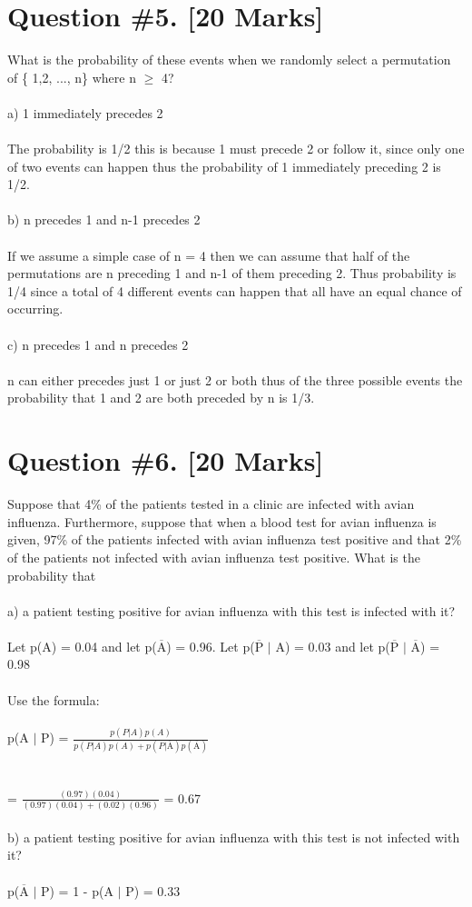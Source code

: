 \documentclass{article}
\begin{document}
\section{Question \#5. [20 Marks]}
What is the probability of these events when we randomly select a permutation of \{ 1,2, ..., n\} where n $\geq$ 4?\\\\
a) 1 immediately precedes 2 \\\\
The probability is 1/2 this is because 1 must precede 2 or follow it, since only one of two events can happen thus the probability of 1 immediately preceding 2 is 1/2.  \\\\
b) n precedes 1 and n-1 precedes 2 \\\\
If we assume a simple case of n = 4 then we can assume that half of the permutations are n preceding 1 and n-1 of them preceding 2. Thus probability is 1/4 since a total of 4 different events can happen that all have an equal chance of occurring. \\\\
c) n precedes 1 and n precedes 2 \\\\
n can either precedes just 1 or just 2 or both thus of the three possible events the probability that 1 and 2 are both preceded by n is 1/3.

\newpage

\section{Question \#6. [20 Marks]}
Suppose that 4\% of the patients tested in a clinic are infected with avian influenza. Furthermore, suppose that when a blood test for avian influenza is given, 97\% of the patients infected with avian influenza test positive and that 2\% of the patients not infected with avian influenza test positive. What is the probability that \\\\
a) a patient testing positive for avian influenza with this test is infected with it? \\\\
Let p(A) = 0.04 and let p($\overline{\mbox{A}}$) = 0.96.
Let  p($\overline{\mbox{P}}$ $|$ A) = 0.03 and let p($\overline{\mbox{P}}$ $|$ $\overline{\mbox{A}}$) = 0.98 \\\\
Use the formula:\\\\ p(A $| $ P) = $\frac{p(P|A)p(A)}{p(P | A)p(A)+ p(P | \overline{\mbox{A}})p(\overline{\mbox{A}})}$ \\\\\\= $\frac{(0.97)(0.04)}{(0.97)(0.04)+(0.02)(0.96)}$ = 0.67 \\\\
b) a patient testing positive for avian influenza with this test is not infected with it? \\\\
p($\overline{\mbox{A}}$ $|$ P) = 1 - p(A $|$ P) = 0.33
\newpage
\end{document}
